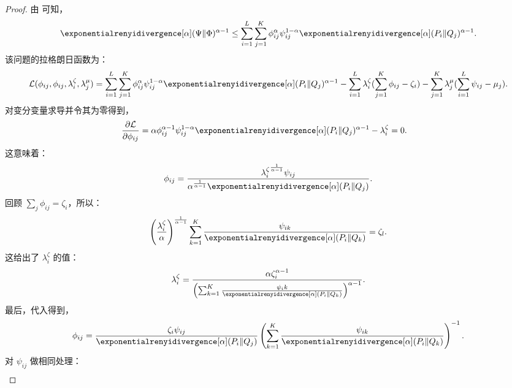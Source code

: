 \begin{proof}
    由  可知，
    \begin{align*}
        \exponentialrenyidivergence[\alpha](\Psi\Vert\Phi)^{\alpha-1}\leq\sum_{i=1}^{L}\sum_{j=1}^K \phi_{ij}^\alpha \psi_{ij}^{1-\alpha} \exponentialrenyidivergence[\alpha](P_i\Vert Q_j)^{\alpha-1}.
    \end{align*}
    该问题的拉格朗日函数为：
    \begin{align*}
        \mathcal{L}(\phi_{ij},\phi_{ij},\lambda_i^{\zeta},\lambda_j^{\mu})=\sum_{i=1}^{L}\sum_{j=1}^K \phi_{ij}^\alpha \psi_{ij}^{1-\alpha} \exponentialrenyidivergence[\alpha](P_i\Vert Q_j)^{\alpha-1} - \sum_{i=1}^L \lambda_i^{\zeta} (\sum_{j=1}^K \phi_{ij} - \zeta_i)
        - \sum_{j=1}^K \lambda_j^{\mu} (\sum_{i=1}^L \psi_{ij} - \mu_j).
    \end{align*}
    对变分变量求导并令其为零得到，
    \begin{align*}
        \frac{\partial \mathcal{L}}{\partial \phi_{ij}} &= \alpha \phi_{ij}^{\alpha-1} \psi_{ij}^{1-\alpha} \exponentialrenyidivergence[\alpha] (P_i\Vert Q_j)^{\alpha-1}-\lambda_i^{\zeta} =0.
    \end{align*}
    这意味着：
    \begin{align*}
        \phi_{ij} = \frac{{\lambda_i^{\zeta}}^{\frac{1}{\alpha-1}}\psi_{ij}}{\alpha^{\frac{1}{\alpha-1}} \exponentialrenyidivergence[\alpha](P_i\Vert Q_j)}.
    \end{align*}
    回顾 $\sum_{j}\phi_{ij}=\zeta_i$，所以：
    \begin{align*}
        \left(\frac{{\lambda_i^{\zeta}}}{\alpha}\right)^{\frac{1}{\alpha-1}} \sum_{k=1}^K \frac{\psi_{ik}}{\exponentialrenyidivergence[\alpha](P_i\Vert Q_k)} = \zeta_l.
    \end{align*}
    这给出了 $\lambda_i^{\zeta}$ 的值：
    \begin{align*}
        \lambda_i^{\zeta} = \frac{\alpha \zeta_i^{\alpha-1}}{\left(\sum_{k=1}^K\frac{\psi_ik}{\exponentialrenyidivergence[\alpha](P_i\Vert Q_k)}\right)^{\alpha-1}}.
    \end{align*}
    最后，代入得到，
    \begin{align*}
        \phi_{ij} = \frac{\zeta_i \psi_{ij}}{ \exponentialrenyidivergence[\alpha](P_i\Vert Q_j)} \left(\sum_{k=1}^K\frac{\psi_{ik}}{\exponentialrenyidivergence[\alpha](P_i\Vert Q_k)}\right)^{-1}.
    \end{align*}
    对 $\psi_{ij}$ 做相同处理：
    \begin{align*}

\end{align*}
\end{proof}
